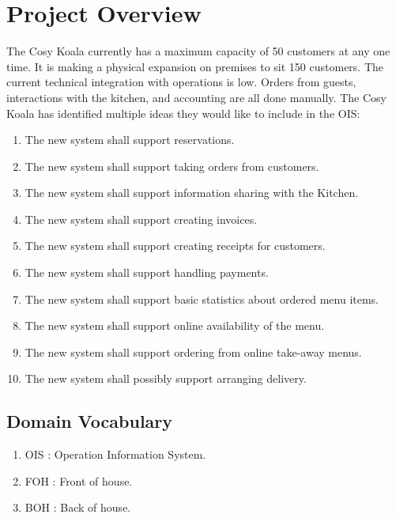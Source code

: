\documentclass{article}
\begin{document}
\section{Project Overview}
The Cosy Koala currently has a maximum capacity of 50 customers at any one time. It is making a physical expansion on premises to sit 150 customers. The current technical integration with operations is low. Orders from guests, interactions with the kitchen, and accounting are all done manually.
The Cosy Koala has identified multiple ideas they would like to include in the OIS:
\begin{enumerate}
    \item The new system shall support reservations.
    \item The new system shall support taking orders from customers.
    \item The new system shall support information sharing with the Kitchen.
    \item The new system shall support creating invoices.
    \item The new system shall support creating receipts for customers.
    \item The new system shall support handling payments.
    \item The new system shall support basic statistics about ordered menu items.
    \item The new system shall support online availability of the menu.
    \item The new system shall support ordering from online take-away menus.
    \item The new system shall possibly support arranging delivery.
\end{enumerate}

\subsection{Domain Vocabulary}
\begin{enumerate}
    \item OIS : Operation Information System.
    \item FOH : Front of house.
    \item BOH : Back of house.
\end{enumerate}
\end{document}
